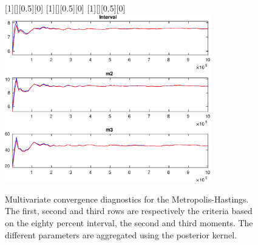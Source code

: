  
\begin{figure}[H]
[1][][0.5][0]{ }
[1][][0.5][0]{ }
[1][][0.5][0]{ }
\centering 
\includegraphics[width=0.8\textwidth]{AnSchoModTheBuilder/Output/AnSchoModTheBuilder_mdiag}
\caption{Multivariate convergence diagnostics for the Metropolis-Hastings.
The first, second and third rows are respectively the criteria based on
the eighty percent interval, the second and third moments. The different 
parameters are aggregated using the posterior kernel.}\label{Fig:MultivariateDiagnostics}
\end{figure}

